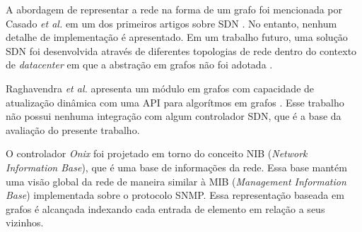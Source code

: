 A abordagem de representar a rede na forma de um grafo foi mencionada 
por Casado \emph{et al.} em um dos primeiros artigos sobre SDN
\citep{martin2010virtualizing}.
No entanto, nenhum detalhe de implementação é apresentado.
Em um trabalho futuro, uma solução SDN foi desenvolvida através de 
diferentes topologias de rede dentro do contexto de \emph{datacenter} 
em que a abstração em grafos não foi adotada \citep{ripcord}. 

Raghavendra \emph{et al.} apresenta um módulo em grafos com capacidade 
de atualização dinâmica com uma API para algorítmos em grafos
\citep{ramya2012dynamic}.
Esse trabalho não possui nenhuma integração com algum controlador SDN,
que é a base da avaliação do presente trabalho.

O controlador \emph{Onix} \citep{teemu2010onix} foi projetado em torno do 
conceito NIB (\emph{Network Information Base}), que é uma base 
de informações da rede.
Essa base mantém uma visão global da rede de maneira similar à 
MIB (\emph{Management Information Base}) implementada sobre o
protocolo SNMP.
Essa representação baseada em grafos é alcançada indexando cada
entrada de elemento em relação a seus vizinhos.

